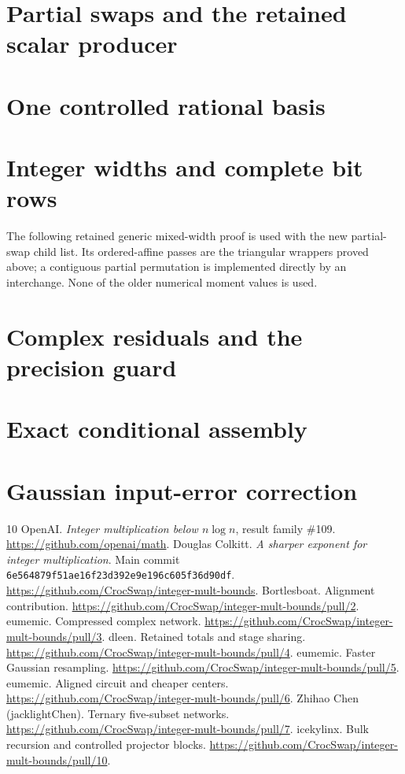 \documentclass[11pt]{article}
\begin{document}
\section{Partial swaps and the retained scalar producer}

\section{One controlled rational basis}

\section{Integer widths and complete bit rows}
The following retained generic mixed-width proof is used with the new
partial-swap child list. Its ordered-affine passes are the triangular
wrappers proved above; a contiguous partial permutation is implemented
directly by an interchange. None of the older numerical moment values is
used.

\section{Complex residuals and the precision guard}

\section{Exact conditional assembly}

\section{Gaussian input-error correction}


\begin{thebibliography}{10}
 OpenAI. \emph{Integer multiplication below $n\log n$},
result family \#109. \url{https://github.com/openai/math}.
 Douglas Colkitt. \emph{A sharper exponent for integer
multiplication}. Main commit
\texttt{6e564879f51ae16f23d392e9e196c605f36d90df}.
\url{https://github.com/CrocSwap/integer-mult-bounds}.
 Bortlesboat. Alignment contribution.
\url{https://github.com/CrocSwap/integer-mult-bounds/pull/2}.
 eumemic. Compressed complex network.
\url{https://github.com/CrocSwap/integer-mult-bounds/pull/3}.
 dleen. Retained totals and stage sharing.
\url{https://github.com/CrocSwap/integer-mult-bounds/pull/4}.
 eumemic. Faster Gaussian resampling.
\url{https://github.com/CrocSwap/integer-mult-bounds/pull/5}.
 eumemic. Aligned circuit and cheaper centers.
\url{https://github.com/CrocSwap/integer-mult-bounds/pull/6}.
 Zhihao Chen (jacklightChen). Ternary five-subset networks.
\url{https://github.com/CrocSwap/integer-mult-bounds/pull/7}.
 icekylinx. Bulk recursion and controlled projector blocks.
\url{https://github.com/CrocSwap/integer-mult-bounds/pull/10}.
\end{thebibliography}
\end{document}
